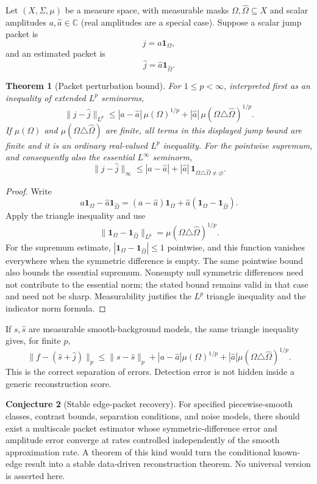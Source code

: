 \documentclass[11pt]{article}
\newtheorem{theorem}{Theorem}[section]
\theoremstyle{definition}
\newtheorem{conjecture}[theorem]{Conjecture}
\theoremstyle{remark}
\newcommand{\bbC}{\mathbb C}
\begin{document}
Let $(X,\Sigma,\mu)$ be a measure space, with measurable masks $\Omega,\widehat\Omega\subseteq X$ and scalar amplitudes $a,\widehat a\in\bbC$ (real amplitudes are a special case). Suppose a scalar jump packet is
\[
j=a\mathbf 1_{\Omega},
\]
and an estimated packet is
\[
\widehat j=\widehat a\mathbf 1_{\widehat\Omega}.
\]

\begin{theorem}[Packet perturbation bound]\label{result:12}
For $1\le p<\infty$, interpreted first as an inequality of extended $L^p$ seminorms,
\[
\boxed{
\|j-\widehat j\|_{L^p}
\le
|a-\widehat a|\,\mu(\Omega)^{1/p}
+
|\widehat a|\,\mu(\Omega\triangle\widehat\Omega)^{1/p}.
}
\]
If $\mu(\Omega)$ and $\mu(\Omega\triangle\widehat\Omega)$ are finite, all terms in this displayed jump bound are finite and it is an ordinary real-valued $L^p$ inequality. For the pointwise supremum, and consequently also the essential $L^\infty$ seminorm,
\[
\|j-\widehat j\|_{\infty}
\le |a-\widehat a|+|\widehat a|\,
\mathbf 1_{\Omega\triangle\widehat\Omega\ne\varnothing}.
\]
\end{theorem}

\begin{proof}
Write
\[
a\mathbf 1_{\Omega}-\widehat a\mathbf 1_{\widehat\Omega}
=(a-\widehat a)\mathbf 1_{\Omega}
+\widehat a(\mathbf 1_{\Omega}-\mathbf 1_{\widehat\Omega}).
\]
Apply the triangle inequality and use
\[
\|\mathbf 1_{\Omega}-\mathbf 1_{\widehat\Omega}\|_{L^p}
=\mu(\Omega\triangle\widehat\Omega)^{1/p}.
\]
For the supremum estimate, $|\mathbf1_\Omega-\mathbf1_{\widehat\Omega}|\le1$ pointwise, and this function vanishes everywhere when the symmetric difference is empty. The same pointwise bound also bounds the essential supremum. Nonempty null symmetric differences need not contribute to the essential norm; the stated bound remains valid in that case and need not be sharp. Measurability justifies the $L^p$ triangle inequality and the indicator norm formula.
\end{proof}

If $s,\widehat s$ are measurable smooth-background models, the same triangle inequality gives, for finite $p$,
\[
\boxed{
\|f-(\widehat s+\widehat j)\|_p
\le
\|s-\widehat s\|_p
+|a-\widehat a|\mu(\Omega)^{1/p}
+|\widehat a|\mu(\Omega\triangle\widehat\Omega)^{1/p}.
}
\]
This is the correct separation of errors. Detection error is not hidden inside a generic reconstruction score.

\begin{conjecture}[Stable edge-packet recovery]
For specified piecewise-smooth classes, contrast bounds, separation conditions, and noise models, there should exist a multiscale packet estimator whose symmetric-difference error and amplitude error converge at rates controlled independently of the smooth approximation rate. A theorem of this kind would turn the conditional known-edge result into a stable data-driven reconstruction theorem. No universal version is asserted here.
\end{conjecture}
\end{document}
